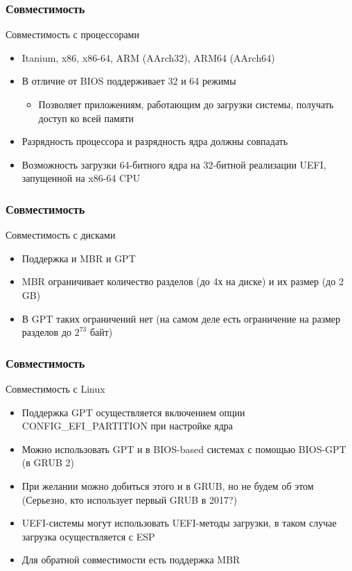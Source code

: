 \documentclass{beamer}
\begin{document}
\begin{frame}\frametitle{Совместимость}
Совместимость с процессорами
\begin{itemize}
    \item Itanium, x86, x86-64, ARM (AArch32), ARM64 (AArch64)
    \item В отличие от BIOS поддерживает 32 и 64 режимы
    \begin{itemize}
        \item Позволяет приложениям, работающим до загрузки системы, получать доступ ко всей памяти
    \end{itemize}
    \item Разрядность процессора и разрядность ядра должны совпадать
    \item Возможность загрузки 64-битного ядра на 32-битной реализации UEFI, запущенной на x86-64 CPU
\end{itemize}
\end{frame}

\begin{frame}\frametitle{Совместимость}
Совместимость с дисками
\begin{itemize}
    \item Поддержка и MBR и GPT
    \item MBR ограничивает количество разделов (до 4х на диске) и их размер (до 2 GB)
    \item В GPT таких ограничений нет (на самом деле есть ограничение на размер разделов до \(2 ^ {73}\) байт)
\end{itemize}
\end{frame}

\begin{frame}\frametitle{Совместимость}
Совместимость с Linux
\begin{itemize}
    \item Поддержка GPT осуществляется включением опции CONFIG\_EFI\_PARTITION при настройке ядра
    \item Можно использовать GPT и в BIOS-based системах с помощью BIOS-GPT (в GRUB 2)
    \item При желании можно добиться этого и в GRUB, но не будем об этом (Серьезно, кто использует первый GRUB в 2017?)
    \item UEFI-системы могут использовать UEFI-методы загрузки, в таком случае загрузка осуществляется с ESP 
    \item Для обратной совместимости есть поддержка MBR
\end{itemize}
\end{frame}
\end{document}
